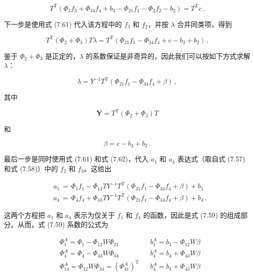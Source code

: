 \documentclass[10pt,a4paper]{book}
\theoremstyle{thmstyle} %
\theoremstyle{defstyle} %
\theoremstyle{prostyle} %
\begin{document}
$$
T ^{\mathrm { T} } ( \Phi _ { 3 } f _ { 3 } + \Phi _ { 34 } f _ { 4 } + b _ { 3 } - \Phi _ { 21 } f _ { 1 } - \Phi _ { 2 } f _ { 2 } - b _ { 2 } ) = T ^{\mathrm { T} } c \, .
$$



下一步是使用式 (7.61) 代入该方程中的 $f_{3}$ 和 $f_{2}$，并按 $\lambda$ 合并同类项，得到



$$
T ^{\mathrm { T} } ( \Phi _ { 2 } + \Phi _ { 3 } ) T \lambda = T ^{\mathrm { T} } ( \Phi _ { 21 } f _ { 1 } - \Phi _ { 34 } f _ { 4 } + c - b _ { 3 } + b _ { 2 } ) \, .
$$



鉴于 $\Phi_{2}+\Phi_{3}$ 是正定的，$\lambda$ 的系数保证是非奇异的，因此我们可以按如下方式求解 $\lambda$：



$$
\lambda = Y ^{- 1} T ^{\mathrm { T} } ( \Phi _ { 21 } f _ { 1 } - \Phi _ { 34 } f _ { 4 } + \beta ) \, ,
$$



其中



$$
\mathbf { Y } = T ^{\mathrm { T} } ( \Phi _ { 2 } + \Phi _ { 3 } ) T
$$



和



$$
\beta = c - b _ { 3 } + b _ { 2 } \, .
$$



最后一步是同时使用式 (7.61) 和式 (7.62)，代入 $a_{1}$ 和 $a_{4}$ 表达式（取自式 (7.57) 和式 (7.58)）中的 $f_{2}$ 和 $f_{3}$。这给出



$$
\begin{array}{rl} & { a _ { 1 } \, = \, \Phi _ { 1 } f _ { 1 } - \Phi _ { 12 } T Y ^{- 1} T ^{\mathrm { T} } ( \Phi _ { 21 } f _ { 1 } - \Phi _ { 34 } f _ { 4 } + \beta ) + b _ { 1 } } \\& { a _ { 4 } \, = \, \Phi _ { 4 } f _ { 4 } + \Phi _ { 43 } T Y ^{- 1} T ^{\mathrm { T} } ( \Phi _ { 21 } f _ { 1 } - \Phi _ { 34 } f _ { 4 } + \beta ) + b _ { 4 } \, . } \end{array}
$$



这两个方程把 $a_{1}$ 和 $a_{4}$ 表示为仅关于 $f_{1}$ 和 $f_{4}$ 的函数，因此是式 (7.59) 的组成部分。从而，式 (7.59) 系数的公式为



$$
\begin{array}{rlrl} & { \Phi _ { 1 } ^{A} = \Phi _ { 1 } - \Phi _ { 12 } W \Phi _ { 21 } } & & { b _ { 1 } ^{A} = b _ { 1 } - \Phi _ { 12 } W \beta } \\& { \Phi _ { 4 } ^{A} = \Phi _ { 4 } - \Phi _ { 43 } W \Phi _ { 34 } } & & { b _ { 4 } ^{A} = b _ { 4 } + \Phi _ { 43 } W \beta } \\& { \Phi _ { 14 } ^{A} = \Phi _ { 12 } W \Phi _ { 34 } = ( \Phi _ { 41 } ^{A} ) ^{\mathrm { T} } } & & { b _ { 4 } ^{A} = b _ { 4 } + \Phi _ { 43 } W \beta } \end{array}
$$
\end{document}
